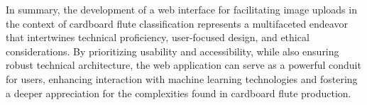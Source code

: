 \vspace{1em}

In summary, the development of a web interface for facilitating image uploads in the context of cardboard flute classification represents a multifaceted endeavor that intertwines technical proficiency, user-focused design, and ethical considerations. By prioritizing usability and accessibility, while also ensuring robust technical architecture, the web application can serve as a powerful conduit for users, enhancing interaction with machine learning technologies and fostering a deeper appreciation for the complexities found in cardboard flute production.




